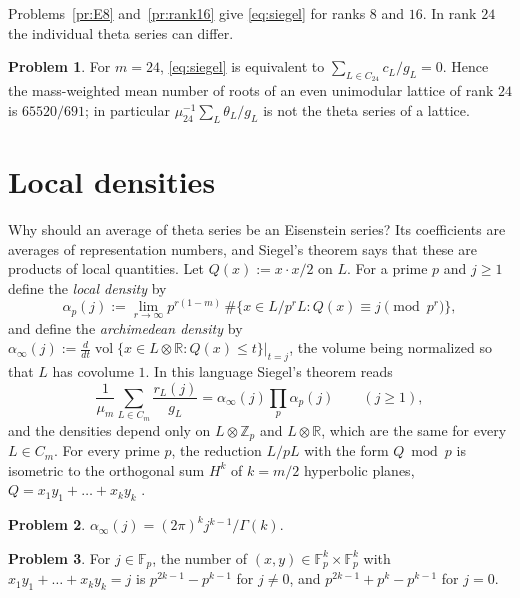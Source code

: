 \documentclass[reqno]{amsart}
\theoremstyle{definition}
\newtheorem{problem}{Problem}[section]
\theoremstyle{plain}
\newcommand{\Z}{\mathbb{Z}}
\newcommand{\R}{\mathbb{R}}
\newcommand{\F}{\mathbb{F}}
\begin{document}
Problems~\ref{pr:E8} and~\ref{pr:rank16} give \eqref{eq:siegel} for ranks \(8\) and \(16\).  In rank \(24\) the individual theta series can differ.

\begin{problem}\label{pr:niemeier}
For \(m = 24\), \eqref{eq:siegel} is equivalent to \(\sum_{L \in C_{24}} c_L/g_L = 0\).  Hence the mass-weighted mean number of roots of an even unimodular lattice of rank \(24\) is \(65520/691\); in particular \(\mu_{24}^{-1}\sum_L \theta_L/g_L\) is not the theta series of a lattice.
\end{problem}


\section{Local densities}\label{sec:densities}

Why should an average of theta series be an Eisenstein series?  Its coefficients are averages of representation numbers, and Siegel's theorem says that these are products of local quantities.  Let \(Q(x) := x\cdot x/2\) on \(L\).  For a prime \(p\) and \(j \ge 1\) define the \emph{local density} by
\[
  \alpha_p(j) := \lim_{r \to \infty} p^{r(1-m)}\, \#\{x \in L/p^rL : Q(x) \equiv j \pmod{p^r}\},
\]
and define the \emph{archimedean density} by \(\alpha_\infty(j) := \frac{d}{dt}\operatorname{vol}\{x \in L \otimes \R : Q(x) \le t\}\big|_{t=j}\), the volume being normalized so that \(L\) has covolume \(1\).  In this language Siegel's theorem reads
\begin{equation}\label{eq:siegel-local}
  \frac{1}{\mu_m}\sum_{L \in C_m} \frac{r_L(j)}{g_L} = \alpha_\infty(j) \prod_p \alpha_p(j) \qquad (j \ge 1),
\end{equation}
and the densities depend only on \(L \otimes \Z_p\) and \(L \otimes \R\), which are the same for every \(L \in C_m\).  For every prime \(p\), the reduction \(L/pL\) with the form \(Q \bmod p\) is isometric to the orthogonal sum \(H^k\) of \(k = m/2\) hyperbolic planes, \(Q = x_1y_1 + \dots + x_k y_k\) \cite[Ch.~8]{Ca}.

\begin{problem}\label{pr:alpha-inf}
\(\alpha_\infty(j) = (2\pi)^k j^{k-1}/\Gamma(k)\).
\end{problem}

\begin{problem}\label{pr:count-Fp}
For \(j\in\F_p\), the number of \((x, y) \in \F_p^k \times \F_p^k\) with \(x_1y_1 + \dots + x_ky_k = j\) is \(p^{2k-1} - p^{k-1}\) for \(j \ne 0\), and \(p^{2k-1} + p^k - p^{k-1}\) for \(j = 0\).
\end{problem}
\end{document}
